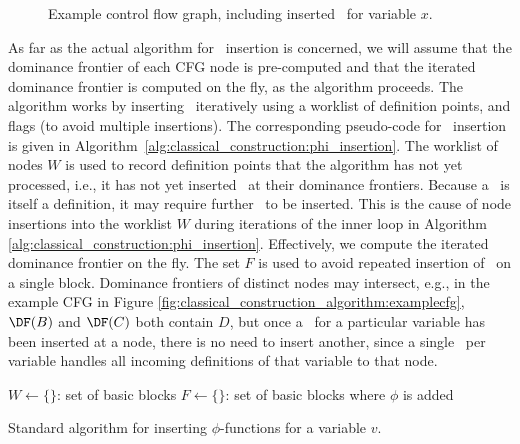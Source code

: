 {\begin{figure}
\caption{\label{fig:classical_construction_algorithm:examplecfg_varx}Example control flow graph, including
inserted \phifuns\ for variable $x$.
}
\end{figure}



As far as the actual algorithm for \phifuns\ insertion
is concerned, we will assume that the dominance
frontier of each CFG node is pre-computed and that the iterated dominance 
frontier is computed on the fly, as the algorithm proceeds.
The algorithm works by inserting \phifuns\ iteratively
using a worklist of definition points, and flags (to avoid multiple
insertions). The corresponding pseudo-code for
\phifun\ insertion is given in
Algorithm~\ref{alg:classical_construction:phi_insertion}.
%
The worklist of nodes $W$ is used to record definition points that the
algorithm
has not yet processed, i.e., it has not yet inserted \phifuns\ at their dominance
frontiers.
Because a \phifun\ is itself a 
definition, it may require further \phifuns\ to be inserted.
This is the cause of node insertions into the worklist $W$ during
iterations of the inner loop in Algorithm 
\ref{alg:classical_construction:phi_insertion}.
Effectively, we compute the iterated dominance frontier on the fly.
%
The set $F$ is used to avoid repeated insertion of \phifuns\
on a single block. Dominance
frontiers
of distinct nodes may intersect, e.g., in the example CFG in Figure
\ref{fig:classical_construction_algorithm:examplecfg},
$\DF(B)$ and $\DF(C)$ both contain $D$, but
once a \phifun\ for a particular variable has been
inserted at a node,
there is no need to insert another, since a single \phifun\ per
variable handles all incoming definitions of that variable to that node.


\begin{algorithm}[h]
 $W \leftarrow \{ \}$: set of basic blocks\;
 $F \leftarrow \{ \}$: set of basic blocks where $\phi$ is added\;
\caption{\label{alg:classical_construction:phi_insertion}Standard algorithm for 
inserting $\phi$-functions for  a variable $v$.}
\end{algorithm}

}
